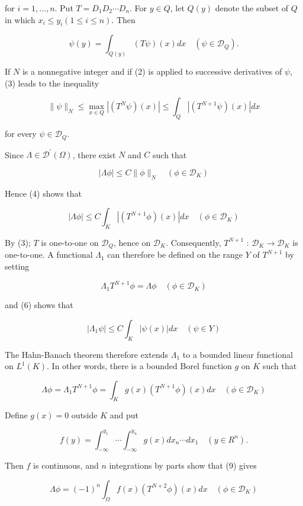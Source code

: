 \documentclass[10pt]{article}
\begin{document}
for $i=1, \ldots, n$. Put $T=D_{1} D_{2} \cdots D_{n}$. For $y \in Q$, let $Q(y)$ denote the subset of $Q$ in which $x_{i} \leq y_{i}(1 \leq i \leq n)$. Then

$$
\psi(y)=\int_{Q(y)}(T \psi)(x) d x \quad\left(\psi \in \mathscr{D}_{Q}\right) .
$$

If $N$ is a nonnegative integer and if (2) is applied to successive derivatives of $\psi$, (3) leads to the inequality

$$
\|\psi\|_{N} \leq \max _{x \in Q}\left|\left(T^{N} \psi\right)(x)\right| \leq \int_{Q}\left|\left(T^{N+1} \psi\right)(x)\right| d x
$$

for every $\psi \in \mathscr{D}_{Q}$.

Since $\Lambda \in \mathscr{D}^{\prime}(\Omega)$, there exist $N$ and $C$ such that

$$
|\Lambda \phi| \leq C\|\phi\|_{N} \quad\left(\phi \in \mathscr{D}_{K}\right)
$$

Hence (4) shows that

$$
|\Lambda \phi| \leq C \int_{K}\left|\left(T^{N+1} \phi\right)(x)\right| d x \quad\left(\phi \in \mathscr{D}_{K}\right)
$$

By (3); $T$ is one-to-one on $\mathscr{D}_{Q}$, hence on $\mathscr{D}_{K}$. Consequently, $T^{N+1}$ : $\mathscr{D}_{K} \rightarrow \mathscr{D}_{K}$ is one-to-one. A functional $\Lambda_{1}$ can therefore be defined on the range $Y$ of $T^{N+1}$ by setting

$$
\Lambda_{1} T^{N+1} \phi=\Lambda \phi \quad\left(\phi \in \mathscr{D}_{K}\right)
$$

and (6) shows that

$$
\left|\Lambda_{1} \psi\right| \leq C \int_{K}|\psi(x)| d x \quad(\psi \in Y)
$$

The Hahn-Banach theorem therefore extends $\Lambda_{1}$ to a bounded linear functional on $L^{1}(K)$. In other words, there is a bounded Borel function $g$ on $K$ such that

$$
\Lambda \phi=\Lambda_{1} T^{N+1} \phi=\int_{K} g(x)\left(T^{N+1} \phi\right)(x) d x \quad\left(\phi \in \mathscr{D}_{K}\right)
$$

Define $g(x)=0$ outside $K$ and put

$$
f(y)=\int_{-\infty}^{y_{1}} \cdots \int_{-\infty}^{y_{n}} g(x) d x_{n} \cdots d x_{1} \quad\left(y \in R^{n}\right) .
$$

Then $f$ is continuous, and $n$ integrations by parts show that (9) gives

$$
\Lambda \phi=(-1)^{n} \int_{\Omega} f(x)\left(T^{N+2} \phi\right)(x) d x \quad\left(\phi \in \mathscr{D}_{K}\right)
$$
\end{document}
